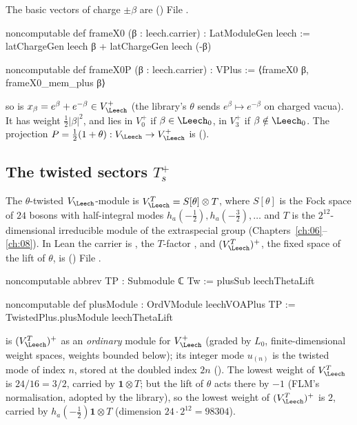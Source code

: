 The basic vectors of charge $\pm\beta$ are ()
File .
\begin{leancode}
noncomputable def frameX0 (β : leech.carrier) : LatModuleGen leech :=
  latChargeGen leech β + latChargeGen leech (-β)

noncomputable def frameX0P (β : leech.carrier) : VPlus := ⟨frameX0 β, frameX0_mem_plus β⟩
\end{leancode}
so  is $x_\beta=e^\beta+e^{-\beta}\in V_\Leech^+$ (the library's $\theta$ sends
$e^\beta\mapsto e^{-\beta}$ on charged vacua).  It has weight $\tfrac12|\beta|^2$, and lies in $V_0^+$
if $\beta\in\Leech_0$, in $V_3^+$ if $\beta\notin\Leech_0$.  The projection
$P=\tfrac12(1+\theta):V_\Leech\to V_\Leech^+$ is  ().

\subsection{The twisted sectors \texorpdfstring{$T_s^+$}{T\_s⁺}}

The $\theta$-twisted $V_\Leech$-module is $V_\Leech^T=S[\theta]\otimes T$, where $S[\theta]$ is the Fock
space of $24$ bosons with half-integral modes $h_a(-\tfrac12),h_a(-\tfrac32),\dots$ and $T$ is the
$2^{12}$-dimensional irreducible module of the extraspecial group (Chapters~\ref{ch:06}--\ref{ch:08}).
In Lean the carrier is , the $T$-factor , and $(V_\Leech^T)^+$, the fixed space
of the lift of $\theta$, is ()
File .
\begin{leancode}
noncomputable abbrev TP : Submodule ℂ Tw := plusSub leechThetaLift

noncomputable def plusModule : OrdVModule leechVOAPlus TP :=
  TwistedPlus.plusModule leechThetaLift
\end{leancode}
 is $(V_\Leech^T)^+$ as an \emph{ordinary} module for $V_\Leech^+$ (graded by $L_0$,
finite-dimensional weight spaces, weights bounded below); its integer mode $u_{(n)}$ is the twisted mode
of index $n$, stored at the doubled index $2n$ ().  The lowest weight of
$V_\Leech^T$ is $24/16=3/2$, carried by $\mathbf 1\otimes T$; but the lift of $\theta$ acts there by $-1$
(FLM's normalisation, adopted by the library), so the lowest weight of $(V_\Leech^T)^+$ is $2$, carried
by $h_a(-\tfrac12)\mathbf 1\otimes T$ (dimension $24\cdot2^{12}=98304$).

